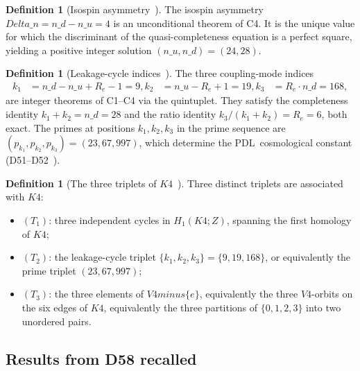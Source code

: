 \documentclass[11pt,a4paper]{article}
\def\\{}%
\def\Vfour{V4}%
\def\Kfour{K4}%
\def\Re{Re}%
\def\PDL{PDL}%
\def\setminus{ minus }%
\def\mathbb#1{#1}%
\def\textsc#1{#1}%
\def\nuu{n\_u}%
\def\ndd{n\_d}%
\def\Dn{Delta\_n}%
\theoremstyle{plain}
\theoremstyle{definition}
\newtheorem{definition}[theorem]{Definition}
\theoremstyle{remark}
\newcommand{\PDL}{\textsc{PDL}}
\newcommand{\Kfour}{K_4}
\newcommand{\Vfour}{V_4}
\renewcommand{\Re}{R_e}
\newcommand{\nuu}{n_u}
\newcommand{\ndd}{n_d}
\newcommand{\Dn}{\Delta n}
\newcommand{\kone}{k_1}
\newcommand{\ktwo}{k_2}
\newcommand{\kthree}{k_3}
\begin{document}
\begin{definition}[Isospin asymmetry~{\cite{PDL_D47}}]
\label{def:Dn}
The isospin asymmetry $\Dn = \ndd - \nuu = 4$ is an unconditional theorem of C4. It is the unique value for which the discriminant of the quasi-completeness equation is a perfect square, yielding a positive integer solution $(\nuu, \ndd) = (24, 28)$.
\end{definition}

\begin{definition}[Leakage-cycle indices~{\cite{PDL_D51}}]
\label{def:leakage_indices}
The three coupling-mode indices
\begin{align*}
\kone &= \ndd - \nuu + \Re - 1 = 9, \\
\ktwo &= \nuu - \Re + 1 = 19, \\
\kthree &= \Re \cdot \ndd = 168,
\end{align*}
are integer theorems of C1--C4 via the quintuplet. They satisfy the completeness identity $\kone + \ktwo = \ndd = 28$ and the ratio identity $\kthree/(\kone + \ktwo) = \Re = 6$, both exact. The primes at positions $\kone, \ktwo, \kthree$ in the prime sequence are $(p_{\kone}, p_{\ktwo}, p_{\kthree}) = (23, 67, 997)$, which determine the \PDL\ cosmological constant (D51--D52~\cite{PDL_D51,PDL_D52}).
\end{definition}

\begin{definition}[The three triplets of $\Kfour$~{\cite{PDL_D51,PDL_D58}}]
\label{def:three_triplets}
Three distinct triplets are associated with $\Kfour$:
\begin{itemize}[leftmargin=2em]
\item $(T_1)$: three independent cycles in $H_1(\Kfour;\mathbb{Z})$, spanning the first homology of $\Kfour$;
\item $(T_2)$: the leakage-cycle triplet $\{\kone, \ktwo, \kthree\} = \{9, 19, 168\}$, or equivalently the prime triplet $(23, 67, 997)$;
\item $(T_3)$: the three elements of $\Vfour \setminus \{e\}$, equivalently the three $\Vfour$-orbits on the six edges of $\Kfour$, equivalently the three partitions of $\{0,1,2,3\}$ into two unordered pairs.
\end{itemize}
\end{definition}

\subsection{Results from D58 recalled}
\end{document}
